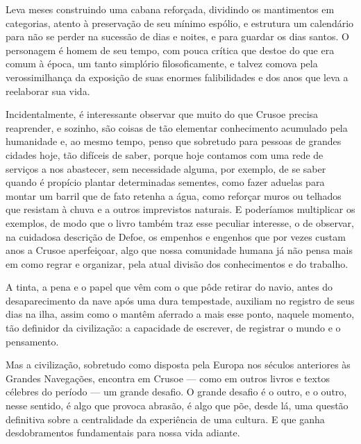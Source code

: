 Leva meses construindo uma cabana reforçada, dividindo os mantimentos em
categorias, atento à preservação de seu mínimo espólio, e estrutura um
calendário para não se perder na sucessão de dias e noites, e para
guardar os dias santos. O personagem é homem de seu tempo, com pouca
crítica que destoe do que era comum à época, um tanto simplório
filosoficamente, e talvez comova pela verossimilhança da exposição de
suas enormes falibilidades e dos anos que leva a reelaborar sua vida.

Incidentalmente, é interessante observar que muito do que Crusoe precisa
reaprender, e sozinho, são coisas de tão elementar conhecimento
acumulado pela humanidade e, ao mesmo tempo, penso que sobretudo para
pessoas de grandes cidades hoje, tão difíceis de saber, porque hoje
contamos com uma rede de serviços a nos abastecer, sem necessidade
alguma, por exemplo, de se saber quando é propício plantar determinadas
sementes, como fazer aduelas para montar um barril que de fato retenha a
água, como reforçar muros ou telhados que resistam à chuva e a outros
imprevistos naturais. E poderíamos multiplicar os exemplos, de modo que
o livro também traz esse peculiar interesse, o de observar, na cuidadosa
descrição de Defoe, os empenhos e engenhos que por vezes custam anos a
Crusoe aperfeiçoar, algo que nossa comunidade humana já não pensa mais
em como regrar e organizar, pela atual divisão dos conhecimentos e do
trabalho.

A tinta, a pena e o papel que vêm com o que pôde retirar do navio, antes
do desaparecimento da nave após uma dura tempestade, auxiliam no
registro de seus dias na ilha, assim como o mantêm aferrado a mais esse
ponto, naquele momento, tão definidor da civilização: a capacidade de
escrever, de registrar o mundo e o pensamento.

Mas a civilização, sobretudo como disposta pela Europa nos séculos
anteriores às Grandes Navegações, encontra em Crusoe --- como em outros
livros e textos célebres do período --- um grande desafio. O grande
desafio é o outro, e o outro, nesse sentido, é algo que provoca abrasão,
é algo que põe, desde lá, uma questão definitiva sobre a centralidade da
experiência de uma cultura. E que ganha desdobramentos fundamentais para
nossa vida adiante.


